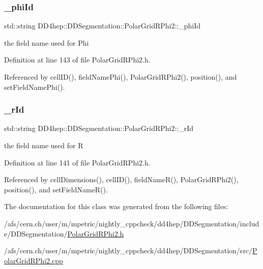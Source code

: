 \subsubsection{\texorpdfstring{\+\_\+phi\+Id}{\_phiId}}
{\footnotesize\ttfamily std\+::string D\+D4hep\+::\+D\+D\+Segmentation\+::\+Polar\+Grid\+R\+Phi2\+::\+\_\+phi\+Id\hspace{0.3cm}{\ttfamily [protected]}}



the field name used for Phi 



Definition at line 143 of file Polar\+Grid\+R\+Phi2.\+h.



Referenced by cell\+I\+D(), field\+Name\+Phi(), Polar\+Grid\+R\+Phi2(), position(), and set\+Field\+Name\+Phi().

\hypertarget{class_d_d4hep_1_1_d_d_segmentation_1_1_polar_grid_r_phi2_a93baa19a86e2412bf85fe2749c9d2bb4}{}\label{class_d_d4hep_1_1_d_d_segmentation_1_1_polar_grid_r_phi2_a93baa19a86e2412bf85fe2749c9d2bb4} 
\subsubsection{\texorpdfstring{\+\_\+r\+Id}{\_rId}}
{\footnotesize\ttfamily std\+::string D\+D4hep\+::\+D\+D\+Segmentation\+::\+Polar\+Grid\+R\+Phi2\+::\+\_\+r\+Id\hspace{0.3cm}{\ttfamily [protected]}}



the field name used for R 



Definition at line 141 of file Polar\+Grid\+R\+Phi2.\+h.



Referenced by cell\+Dimensions(), cell\+I\+D(), field\+Name\+R(), Polar\+Grid\+R\+Phi2(), position(), and set\+Field\+Name\+R().



The documentation for this class was generated from the following files\+:\begin{DoxyCompactItemize}
\item 
/afs/cern.\+ch/user/m/mpetric/nightly\+\_\+cppcheck/dd4hep/\+D\+D\+Segmentation/include/\+D\+D\+Segmentation/\hyperlink{_d_d_segmentation_2include_2_d_d_segmentation_2_polar_grid_r_phi2_8h}{Polar\+Grid\+R\+Phi2.\+h}\item 
/afs/cern.\+ch/user/m/mpetric/nightly\+\_\+cppcheck/dd4hep/\+D\+D\+Segmentation/src/\hyperlink{_d_d_segmentation_2src_2_polar_grid_r_phi2_8cpp}{Polar\+Grid\+R\+Phi2.\+cpp}\end{DoxyCompactItemize}

